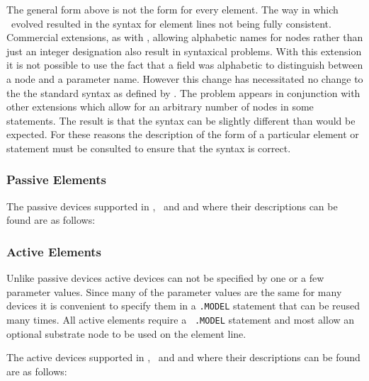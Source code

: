 The general form above is not the form for every element.
The way in which
\spice\ evolved resulted in the syntax for element lines not being
fully consistent. Commercial extensions, as with \pspice,
allowing alphabetic names for nodes rather than just an integer designation
also result in syntaxical problems.
With this extension it is not possible to
use the fact that a field was alphabetic to distinguish between a node
and a parameter name.
However this change has necessitated no change to the the standard syntax
as defined by \spicetwo .
The problem appears in conjunction with other
extensions which allow for an arbitrary
number of nodes in some statements. The result is that the syntax can be
slightly different than would be expected.
For these reasons the description of the form
of a particular element or statement must be consulted to ensure that the
syntax is correct.

\subsubsection{Passive Elements}

The passive devices supported in
{\spicetwo , \spicethree\ and \pspice}
and where their descriptions can be found are as follows:


\subsubsection{Active Elements}


Unlike passive devices active
devices can not be specified by one or a few parameter values.
Since many of the parameter values are the same for many devices
it is convenient to specify them in a {\tt .MODEL} statement that
can be reused many times. All active elements require a {\tt
.MODEL} statement and most allow an optional substrate node to be
used on the element line.

The active devices supported in
{ \spicetwo , \spicethree\ and \pspice}
and where their descriptions can be found are as follows:

